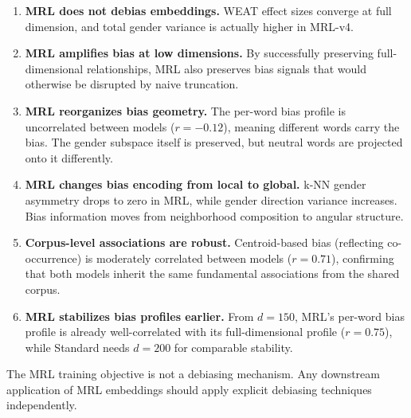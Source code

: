 \documentclass[11pt,a4paper]{article}
\begin{document}
\begin{enumerate}
    \item \textbf{MRL does not debias embeddings.} WEAT effect sizes converge at full dimension, and total gender variance is actually higher in MRL-v4.
    
    \item \textbf{MRL amplifies bias at low dimensions.} By successfully preserving full-dimensional relationships, MRL also preserves bias signals that would otherwise be disrupted by naive truncation.
    
    \item \textbf{MRL reorganizes bias geometry.} The per-word bias profile is uncorrelated between models ($r=-0.12$), meaning different words carry the bias. The gender subspace itself is preserved, but neutral words are projected onto it differently.
    
    \item \textbf{MRL changes bias encoding from local to global.} k-NN gender asymmetry drops to zero in MRL, while gender direction variance increases. Bias information moves from neighborhood composition to angular structure.
    
    \item \textbf{Corpus-level associations are robust.} Centroid-based bias (reflecting co-occurrence) is moderately correlated between models ($r=0.71$), confirming that both models inherit the same fundamental associations from the shared corpus.
    
    \item \textbf{MRL stabilizes bias profiles earlier.} From $d=150$, MRL's per-word bias profile is already well-correlated with its full-dimensional profile ($r=0.75$), while Standard needs $d=200$ for comparable stability.
\end{enumerate}

The MRL training objective is not a debiasing mechanism. Any downstream application of MRL embeddings should apply explicit debiasing techniques independently.
\end{document}
